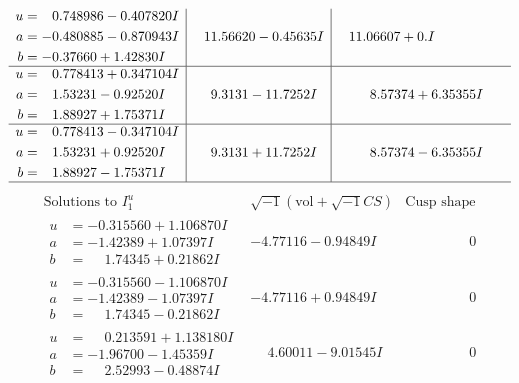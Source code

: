 \documentclass[1p]{elsarticle_modified}
\theoremstyle{definition}
\newcommand{\I}{\sqrt{-1}}
\begin{document}
$$\begin{array}{c|c|c}
\begin{aligned}
u &= \phantom{-}0.748986 - 0.407820 I \\
a &= -0.480885 - 0.870943 I \\
b &= -0.37660 + 1.42830 I\end{aligned}
 & \phantom{-}11.56620 - 0.45635 I & \phantom{-}11.06607 + 0. I\phantom{ +0.000000I} \\ \hline\begin{aligned}
u &= \phantom{-}0.778413 + 0.347104 I \\
a &= \phantom{-}1.53231 - 0.92520 I \\
b &= \phantom{-}1.88927 + 1.75371 I\end{aligned}
 & \phantom{-}9.3131 - 11.7252 I & \phantom{-}8.57374 + 6.35355 I \\ \hline\begin{aligned}
u &= \phantom{-}0.778413 - 0.347104 I \\
a &= \phantom{-}1.53231 + 0.92520 I \\
b &= \phantom{-}1.88927 - 1.75371 I\end{aligned}
 & \phantom{-}9.3131 + 11.7252 I & \phantom{-}8.57374 - 6.35355 I\\
 \hline 
 \end{array}$$\newpage$$\begin{array}{c|c|c}  
\text{Solutions to }I^u_{1}& \I (\text{vol} + \sqrt{-1}CS) & \text{Cusp shape}\\
 \hline 
\begin{aligned}
u &= -0.315560 + 1.106870 I \\
a &= -1.42389 + 1.07397 I \\
b &= \phantom{-}1.74345 + 0.21862 I\end{aligned}
 & -4.77116 - 0.94849 I & \phantom{-0.000000 } 0 \\ \hline\begin{aligned}
u &= -0.315560 - 1.106870 I \\
a &= -1.42389 - 1.07397 I \\
b &= \phantom{-}1.74345 - 0.21862 I\end{aligned}
 & -4.77116 + 0.94849 I & \phantom{-0.000000 } 0 \\ \hline\begin{aligned}
u &= \phantom{-}0.213591 + 1.138180 I \\
a &= -1.96700 - 1.45359 I \\
b &= \phantom{-}2.52993 - 0.48874 I\end{aligned}
 & \phantom{-}4.60011 - 9.01545 I & \phantom{-0.000000 } 0 \\ \hline\begin{aligned}

\end{aligned}
\end{array}$$
\end{document}
